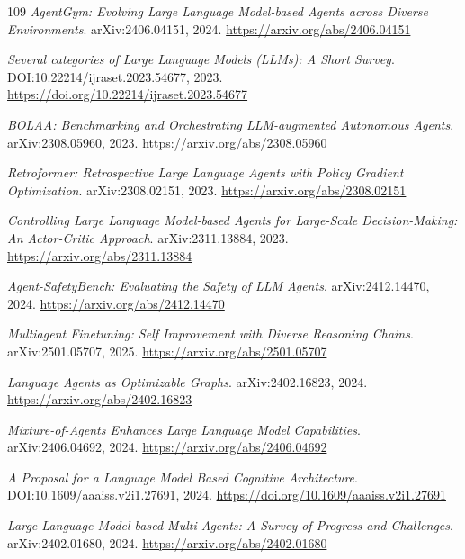 \documentclass[11pt,a4paper]{article}
\begin{document}
\begin{thebibliography}{109}
\newblock \emph{AgentGym: Evolving Large Language Model-based Agents across Diverse Environments}.
\newblock arXiv:2406.04151, 2024.
\newblock \url{https://arxiv.org/abs/2406.04151}

\newblock \emph{Several categories of Large Language Models (LLMs): A Short Survey}.
\newblock DOI:10.22214/ijraset.2023.54677, 2023.
\newblock \url{https://doi.org/10.22214/ijraset.2023.54677}

\newblock \emph{BOLAA: Benchmarking and Orchestrating LLM-augmented Autonomous Agents}.
\newblock arXiv:2308.05960, 2023.
\newblock \url{https://arxiv.org/abs/2308.05960}

\newblock \emph{Retroformer: Retrospective Large Language Agents with Policy Gradient Optimization}.
\newblock arXiv:2308.02151, 2023.
\newblock \url{https://arxiv.org/abs/2308.02151}

\newblock \emph{Controlling Large Language Model-based Agents for Large-Scale Decision-Making: An Actor-Critic Approach}.
\newblock arXiv:2311.13884, 2023.
\newblock \url{https://arxiv.org/abs/2311.13884}

\newblock \emph{Agent-SafetyBench: Evaluating the Safety of LLM Agents}.
\newblock arXiv:2412.14470, 2024.
\newblock \url{https://arxiv.org/abs/2412.14470}

\newblock \emph{Multiagent Finetuning: Self Improvement with Diverse Reasoning Chains}.
\newblock arXiv:2501.05707, 2025.
\newblock \url{https://arxiv.org/abs/2501.05707}

\newblock \emph{Language Agents as Optimizable Graphs}.
\newblock arXiv:2402.16823, 2024.
\newblock \url{https://arxiv.org/abs/2402.16823}

\newblock \emph{Mixture-of-Agents Enhances Large Language Model Capabilities}.
\newblock arXiv:2406.04692, 2024.
\newblock \url{https://arxiv.org/abs/2406.04692}

\newblock \emph{A Proposal for a Language Model Based Cognitive Architecture}.
\newblock DOI:10.1609/aaaiss.v2i1.27691, 2024.
\newblock \url{https://doi.org/10.1609/aaaiss.v2i1.27691}

\newblock \emph{Large Language Model based Multi-Agents: A Survey of Progress and Challenges}.
\newblock arXiv:2402.01680, 2024.
\newblock \url{https://arxiv.org/abs/2402.01680}


\end{thebibliography}
\end{document}
